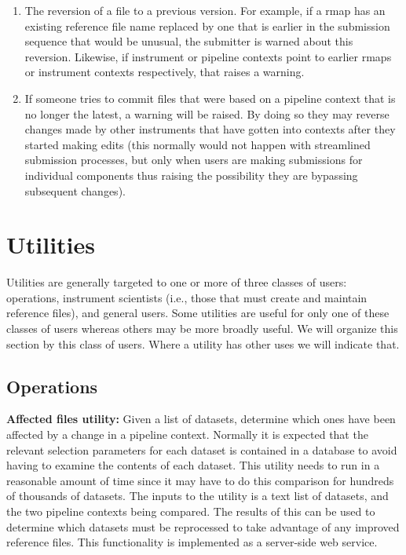 \documentclass[final,authoryear,5p,times,twocolumn]{elsarticle}
\begin{document}
\begin{enumerate}
\item The reversion of a file to a previous version. For example, 
if a rmap has an
existing reference file name replaced by one that is earlier in the submission
sequence that would be unusual, the submitter is warned about this reversion.
Likewise, if instrument or pipeline contexts point to earlier rmaps or instrument
contexts respectively, that raises a warning.

\item If someone tries to commit files that were based on a pipeline context that
is no longer the latest, a warning will be raised. By doing so they may reverse
changes made by other instruments that have gotten into contexts after they
started making edits (this normally would not happen with streamlined submission
processes, but only when users are making submissions for individual components
thus raising the possibility they are bypassing subsequent changes).

\end{enumerate}

\section{Utilities}

Utilities are generally targeted to one or more of three classes of users:
operations, instrument scientists (i.e., those that must create and maintain
reference files), and general users. Some utilities are useful for only one of
these classes of users whereas others may be more broadly useful. We will
organize this section by this class of users. Where a utility has other uses we
will indicate that.

\subsection{Operations}

\textbf{Affected files utility:} Given a list of datasets, determine which ones have
been affected by a change in a pipeline context. Normally it is expected that
the relevant selection parameters for each dataset is contained in a database
to avoid having to examine the contents of each dataset. This utility needs to
run in a reasonable amount of time since it may have to do this comparison for
hundreds of thousands of datasets. The inputs to the utility is a text list of
datasets, and the two pipeline contexts being compared. The results of this
can be used to determine which datasets must be reprocessed to take advantage
of any improved reference files. This functionality is implemented as a server-side
web service.
\end{document}
